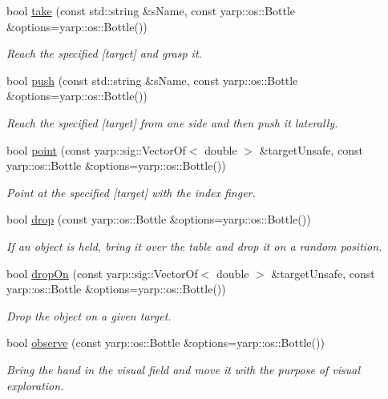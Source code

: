 \begin{DoxyCompactItemize}
bool \hyperlink{group__icubclient__subsystems_a7806d075279d1593b7c63fda368aa3f8}{take} (const std\+::string \&s\+Name, const yarp\+::os\+::\+Bottle \&options=yarp\+::os\+::\+Bottle())
\begin{DoxyCompactList}\small\item\em Reach the specified \mbox{[}target\mbox{]} and grasp it. \end{DoxyCompactList}\item 
bool \hyperlink{group__icubclient__subsystems_a4b1fe9a6c979be5ec739d319ad0e3d94}{push} (const std\+::string \&s\+Name, const yarp\+::os\+::\+Bottle \&options=yarp\+::os\+::\+Bottle())
\begin{DoxyCompactList}\small\item\em Reach the specified \mbox{[}target\mbox{]} from one side and then push it laterally. \end{DoxyCompactList}\item 
bool \hyperlink{group__icubclient__subsystems_a92fbb5f6c28b6bf9c7dec4ef3737b7c6}{point} (const yarp\+::sig\+::\+Vector\+Of$<$ double $>$ \&target\+Unsafe, const yarp\+::os\+::\+Bottle \&options=yarp\+::os\+::\+Bottle())
\begin{DoxyCompactList}\small\item\em Point at the specified \mbox{[}target\mbox{]} with the index finger. \end{DoxyCompactList}\item 
bool \hyperlink{group__icubclient__subsystems_ad54f24f00f6e6db4db644d8f0ec6b278}{drop} (const yarp\+::os\+::\+Bottle \&options=yarp\+::os\+::\+Bottle())
\begin{DoxyCompactList}\small\item\em If an object is held, bring it over the table and drop it on a random position. \end{DoxyCompactList}\item 
bool \hyperlink{group__icubclient__subsystems_aebeca6e5202dc83eaa796c783f5a6e3d}{drop\+On} (const yarp\+::sig\+::\+Vector\+Of$<$ double $>$ \&target\+Unsafe, const yarp\+::os\+::\+Bottle \&options=yarp\+::os\+::\+Bottle())
\begin{DoxyCompactList}\small\item\em Drop the object on a given target. \end{DoxyCompactList}\item 
bool \hyperlink{group__icubclient__subsystems_abe9ce03e08fc25290d89d64eee8ec972}{observe} (const yarp\+::os\+::\+Bottle \&options=yarp\+::os\+::\+Bottle())
\begin{DoxyCompactList}\small\item\em Bring the hand in the visual field and move it with the purpose of visual exploration. \end{DoxyCompactList}\item 

\end{DoxyCompactItemize}
